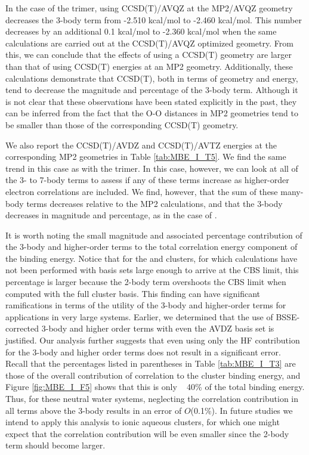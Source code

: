 \documentclass [11pt, proquest] {uwthesis}[2020/02/24]
\begin{document}
\par In the case of the trimer, using CCSD(T)/AVQZ at the MP2/AVQZ geometry decreases the 3-body term from -2.510 kcal/mol to -2.460 kcal/mol. This number decreases by an additional 0.1 kcal/mol to -2.360 kcal/mol when the same calculations are carried out at the CCSD(T)/AVQZ optimized geometry. From this, we can conclude that the effects of using a CCSD(T) geometry are larger than that of using CCSD(T) energies at an MP2 geometry. Additionally, these calculations demonstrate that CCSD(T), both in terms of geometry and energy, tend to decrease the magnitude and percentage of the 3-body term. Although it is not clear that these observations have been stated explicitly in the past, they can be inferred from the fact that the O-O distances in MP2 geometries tend to be smaller than those of the corresponding CCSD(T) geometry\autocite{miliordos_optimal_2013}.

\par We also report the CCSD(T)/AVDZ and CCSD(T)/AVTZ energies at the corresponding MP2 geometries in Table \ref{tab:MBE_I_T5}. We find the same trend in this case as with the trimer. In this case, however, we can look at all of the 3- to 7-body terms to assess if any of these terms increase as higher-order electron correlations are included. We find, however, that the sum of these many-body terms decreases relative to the MP2 calculations, and that the 3-body decreases in magnitude and percentage, as in the case of .

\par It is worth noting the small magnitude and associated percentage contribution of the 3-body and higher-order terms to the total correlation energy component of the binding energy. Notice that for the  and  clusters, for which calculations have not been performed with basis sets large enough to arrive at the CBS limit, this percentage is larger because the 2-body term overshoots the CBS limit when computed with the full cluster basis. This finding can have significant ramifications in terms of the utility of the 3-body and higher-order terms for applications in very large systems. Earlier, we determined that the use of BSSE-corrected 3-body and higher order terms with even the AVDZ basis set is justified. Our analysis further suggests that even using only the HF contribution for the 3-body and higher order terms does not result in a significant error. Recall that the percentages listed in parentheses in Table \ref{tab:MBE_I_T3} are those of the overall contribution of correlation to the cluster binding energy, and Figure \ref{fig:MBE_I_F5} shows that this is only ~ 40\% of the total binding energy. Thus, for these neutral water systems, neglecting the correlation contribution in all terms above the 3-body results in an error of $O$(0.1\%). In future studies we intend to apply this analysis to ionic aqueous clusters, for which one might expect that the correlation contribution will be even smaller since the 2-body term should become larger.
\end{document}
